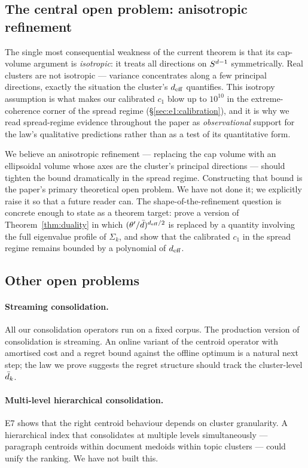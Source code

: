 \subsection{The central open problem: anisotropic refinement}
\label{sec:disc:open}

The single most consequential weakness of the current theorem is
that its cap-volume argument is \emph{isotropic}: it treats all
directions on $S^{d-1}$ symmetrically. Real clusters are not
isotropic --- variance concentrates along a few principal
directions, exactly the situation the cluster's ${d_{\mathrm{eff}}}$ quantifies.
This isotropy assumption is what makes our calibrated $c_1$ blow
up to $10^{10}$ in the extreme-coherence corner of the spread
regime (\S\ref{sec:e1:calibration}), and it is why we read
spread-regime evidence throughout the paper as
\emph{observational} support for the law's qualitative predictions
rather than as a test of its quantitative form.

We believe an anisotropic refinement --- replacing the cap volume
with an ellipsoidal volume whose axes are the cluster's principal
directions --- should tighten the bound dramatically in the spread
regime. Constructing that bound is the paper's primary theoretical
open problem. We have not done it; we explicitly raise it so that a
future reader can. The shape-of-the-refinement question is concrete
enough to state as a theorem target: prove a version of
Theorem~\ref{thm:duality} in which $(\theta'/\bar{d})^{{d_{\mathrm{eff}}}/2}$ is
replaced by a quantity involving the full eigenvalue profile of
$\Sigma_k$, and show that the calibrated $c_1$ in the spread regime
remains bounded by a polynomial of ${d_{\mathrm{eff}}}$.

\subsection{Other open problems}
\label{sec:disc:other-open}

\paragraph{Streaming consolidation.} All our consolidation operators
run on a fixed corpus. The production version of consolidation is
streaming. An online variant of the centroid operator with amortised
cost and a regret bound against the offline optimum is a natural
next step; the law we prove suggests the regret structure should
track the cluster-level $\bar{d}_k$.

\paragraph{Multi-level hierarchical consolidation.} E7 shows that
the right centroid behaviour depends on cluster granularity. A
hierarchical index that consolidates at multiple levels
simultaneously --- paragraph centroids within document medoids
within topic clusters --- could unify the ranking. We have not
built this.

